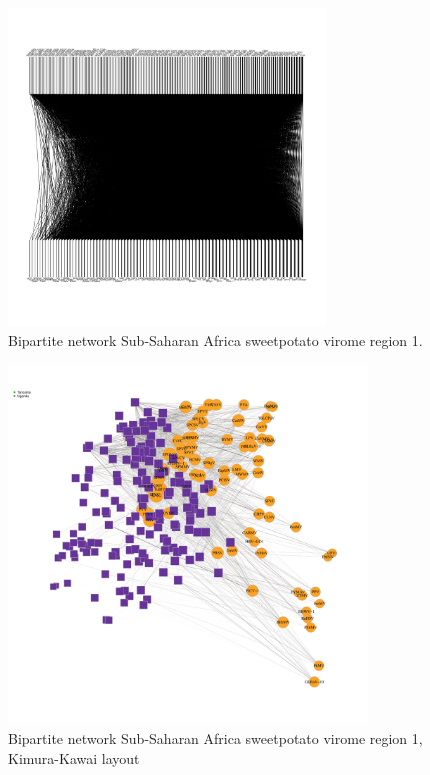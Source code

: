 \documentclass{article}
\begin{document}
\begin{figure}[h!]
\begin{center}
\includegraphics[width=0.75\textwidth]{../results/k-cluster1/1-kcluster_bipartitenetwork_Feb28.pdf
} %
\caption{Bipartite network Sub-Saharan Africa sweetpotato virome region 1.}
\end{center}
\end{figure}



\begin{figure}[h!]
\begin{center}
\includegraphics[width=0.85\textwidth]{../results/k-cluster1/1-kcluster_bipartitenetwork-kk_Feb28.pdf
} %
\caption{Bipartite network Sub-Saharan Africa sweetpotato virome region 1, Kimura-Kawai layout}
\end{center}
\end{figure}
\end{document}

